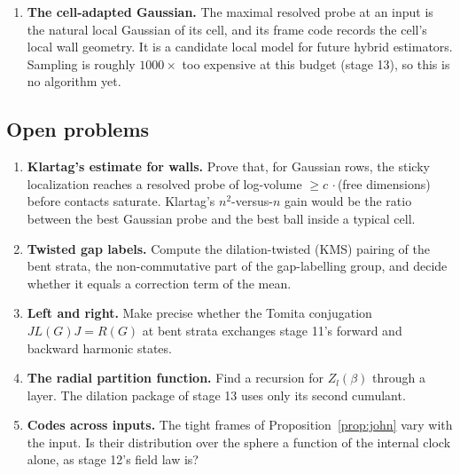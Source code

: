 \begin{enumerate}[leftmargin=*]
\begin{itemize}
\item This is truth-free and costs $O(n^2)$ per layer for the marginal (one-neuron) moment matrices.
\item A first diagnostic: count how often v56's per-neuron moment matrices (orders $\le4$) fail to be positive semidefinite.
\end{itemize}
\item \textbf{The cell-adapted Gaussian.} The maximal resolved probe at an input is the natural local Gaussian of its cell, and its frame
code records the cell's local wall geometry. It is a candidate local model for future hybrid estimators. Sampling is roughly
$1000\times$ too expensive at this budget (stage 13), so this is no algorithm yet.
\end{enumerate}

\subsection{Open problems}
\begin{enumerate}[leftmargin=*]
\item \textbf{Klartag's estimate for walls.} Prove that, for Gaussian rows, the sticky localization reaches a resolved probe of
log-volume $\ge c\,\cdot$(free dimensions) before contacts saturate. Klartag's $n^2$-versus-$n$ gain would be the ratio between the
best Gaussian probe and the best ball inside a typical cell.
\item \textbf{Twisted gap labels.} Compute the dilation-twisted (KMS) pairing of the bent strata, the non-commutative part of the
gap-labelling group, and decide whether it equals a correction term of the mean.
\item \textbf{Left and right.} Make precise whether the Tomita conjugation $JL(G)J=R(G)$ at bent strata exchanges stage 11's forward and
backward harmonic states.
\item \textbf{The radial partition function.} Find a recursion for $Z_l(\beta)$ through a layer. The dilation package of stage 13 uses
only its second cumulant.
\item \textbf{Codes across inputs.} The tight frames of Proposition~\ref{prop:john} vary with the input. Is their distribution over the
sphere a function of the internal clock alone, as stage 12's field law is?
\end{enumerate}
